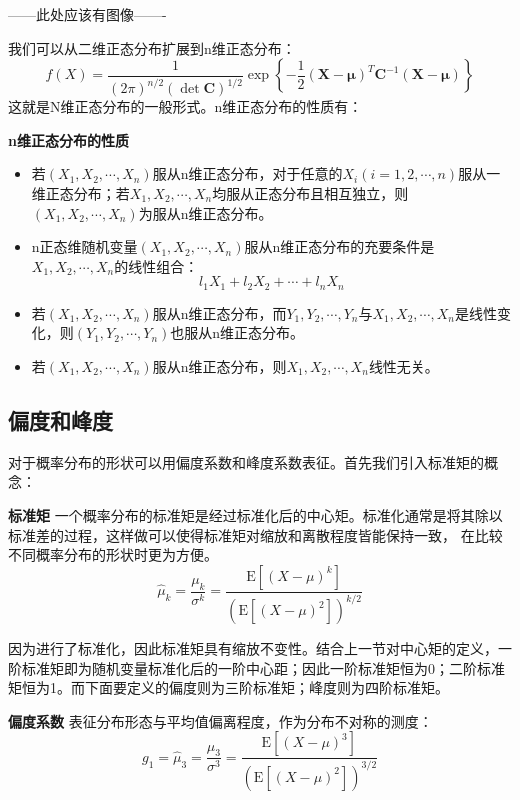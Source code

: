 ------此处应该有图像-------

我们可以从二维正态分布扩展到n维正态分布：
\begin{equation}
    f(X)=\frac{1}{(2\pi)^{n/2} (\det \mathbf{C})^{1/2}}\exp
    \left\{
    -\frac{1}{2}(\mathbf{X}-\boldsymbol{\mu})^T \mathbf{C}^{-1}(\mathbf{X}-\boldsymbol{\mu})
    \right\}
\end{equation}
这就是N维正态分布的一般形式。n维正态分布的性质有：
\begin{prop}{\textbf{n维正态分布的性质}}
    \begin{itemize}
        \item 若$(X_1,X_2,\cdots,X_n)$服从n维正态分布，对于任意的$X_i(i=1,2,\cdots,n)$服从一维正态分布；若$X_1,X_2,\cdots,X_n$均服从正态分布且相互独立，则$(X_1,X_2,\cdots,X_n)$为服从n维正态分布。
        \item n正态维随机变量$(X_1,X_2,\cdots,X_n)$服从n维正态分布的充要条件是$X_1,X_2,\cdots,X_n$的线性组合：$$l_1X_1+l_2X_2+\cdots+l_nX_n$$
        \item 若$(X_1,X_2,\cdots,X_n)$服从n维正态分布，而$Y_1,Y_2,\cdots,Y_n$与$X_1,X_2,\cdots,X_n$是线性变化，则$(Y_1,Y_2,\cdots,Y_n)$也服从n维正态分布。
        \item 若$(X_1,X_2,\cdots,X_n)$服从n维正态分布，则$X_1,X_2,\cdots,X_n$线性无关。
    \end{itemize}
\end{prop}

\subsection{偏度和峰度}
对于概率分布的形状可以用偏度系数和峰度系数表征。首先我们引入标准矩的概念：
\begin{definition}\textbf{标准矩}
    一个概率分布的标准矩是经过标准化后的中心矩。标准化通常是将其除以标准差的过程，这样做可以使得标准矩对缩放和离散程度皆能保持一致， 在比较不同概率分布的形状时更为方便。
    \begin{equation}
        \hat{\mu}_k = \frac{\mu_k}{\sigma^k}=\frac{\mathrm{E}[(X-\mu)^k]}{(\mathrm{E}[(X-\mu)^2])^{k/2}}
    \end{equation}
\end{definition}

因为进行了标准化，因此标准矩具有缩放不变性。结合上一节对中心矩的定义，一阶标准矩即为随机变量标准化后的一阶中心距；因此一阶标准矩恒为0；二阶标准矩恒为1。而下面要定义的偏度则为三阶标准矩；峰度则为四阶标准矩。
\begin{definition}\textbf{偏度系数}
    表征分布形态与平均值偏离程度，作为分布不对称的测度：
    \begin{equation}
        g_1 = \hat{\mu}_3 = \frac{\mu_3}{\sigma^3}=\frac{\mathrm{E}[(X-\mu)^3]}{(\mathrm{E}[(X-\mu)^2])^{3/2}}
    \end{equation}
\end{definition}

